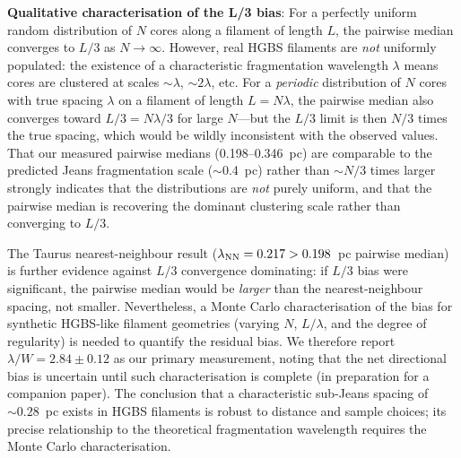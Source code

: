 \documentclass[twoside,twocolumn]{mnras}
\begin{document}
\textbf{Qualitative characterisation of the L/3 bias}: For a perfectly uniform random
distribution of $N$ cores along a filament of length $L$, the pairwise median converges
to $L/3$ as $N \to \infty$. However, real HGBS filaments are \textit{not} uniformly
populated: the existence of a characteristic fragmentation wavelength $\lambda$ means
cores are clustered at scales $\sim\lambda$, $\sim 2\lambda$, etc. For a \textit{periodic}
distribution of $N$ cores with true spacing $\lambda$ on a filament of length $L = N\lambda$,
the pairwise median also converges toward $L/3 = N\lambda/3$ for large $N$---but the
$L/3$ limit is then $N/3$ times the true spacing, which would be wildly inconsistent
with the observed values. That our measured pairwise medians (0.198--0.346~pc) are
comparable to the predicted Jeans fragmentation scale ($\sim$0.4~pc) rather than
$\sim N/3$ times larger strongly indicates that the distributions are \textit{not}
purely uniform, and that the pairwise median is recovering the dominant clustering scale
rather than converging to $L/3$.

The Taurus nearest-neighbour result ($\lambda_{\rm NN} = 0.217 > 0.198$~pc pairwise
median) is further evidence against $L/3$ convergence dominating: if $L/3$ bias were
significant, the pairwise median would be \textit{larger} than the nearest-neighbour
spacing, not smaller. Nevertheless, a Monte Carlo characterisation of the bias for
synthetic HGBS-like filament geometries (varying $N$, $L/\lambda$, and the degree of
regularity) is needed to quantify the residual bias. We therefore report $\lambda/W = 2.84
\pm 0.12$ as our primary measurement, noting that the net directional bias is uncertain
until such characterisation is complete (in preparation for a companion paper). The
conclusion that a characteristic sub-Jeans spacing of $\sim 0.28$~pc exists in HGBS
filaments is robust to distance and sample choices; its precise relationship to the
theoretical fragmentation wavelength requires the Monte Carlo characterisation.
\end{document}
